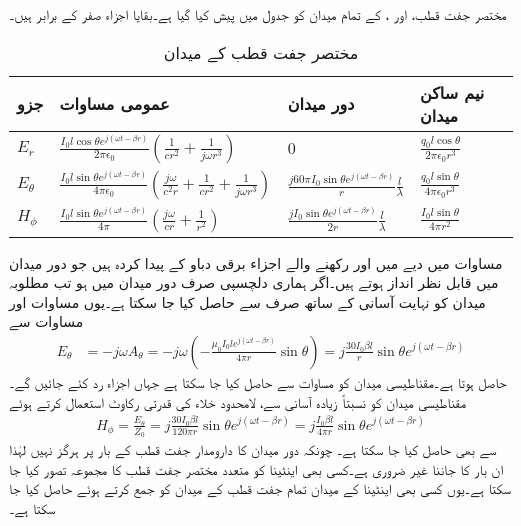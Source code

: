 مختصر جفت قطب،  اور ، کے تمام میدان کو جدول  میں پیش کیا گیا ہے۔بقایا اجزاء  صفر  کے برابر ہیں۔
\begin{table}
\caption{مختصر جفت قطب کے میدان}
\centering
\begin{tabular}{l l l l}
\hline
جزو & عمومی مساوات & دور میدان & نیم ساکن میدان\\
\hline 
\rule{0pt}{2em}
$E_r$ &$\frac{I_0 l \cos \theta e^{j(\omega t -\beta r)}}{2\pi \epsilon_0}\left(\frac{1}{c r^2}+\frac{1}{j \omega r^3} \right)$&$0$&$\frac{q_0 l \cos \theta}{2\pi \epsilon_0 r^3}$ \\[4ex]
$E_{\theta}$&$\frac{I_0 l \sin \theta e^{j(\omega t -\beta r)}}{4\pi \epsilon_0}\left(\frac{j \omega}{c^2 r}+\frac{1}{c r^2}+\frac{1}{j \omega r^3} \right)$&$ \frac{j 60 \pi I_0 \sin \theta e^{j(\omega t-\beta r)}}{r} \frac{l}{\lambda}$& $\frac{q_0 l \sin \theta }{4\pi \epsilon_0 r^3}$\\ [4ex]
$H_{\phi}$&$\frac{I_0 l \sin \theta e^{j(\omega t -\beta r)}}{4\pi} \left(\frac{j \omega}{c r}+\frac{1}{r^2} \right)$&$\frac{j I_0 \sin \theta e^{j(\omega t -\beta r)}}{2r}\frac{l}{\lambda}  $& $\frac{I_0 l \sin \theta }{4\pi r^2} $
\end{tabular}
\label{جدول_اینٹینا_مختصر_جفت_قطب}
\end{table}


مساوات  میں دیے   میں  اور  رکھنے والے اجزاء برقی دباو  کے پیدا کردہ ہیں جو دور میدان میں قابل نظر انداز ہوتے ہیں۔اگر ہماری دلچسپی صرف دور میدان میں ہو تب مطلوبہ میدان کو نہایت آسانی کے ساتھ صرف  سے حاصل کیا جا سکتا ہے۔یوں مساوات  اور مساوات  سے
\begin{align}\label{مساوات_اینٹینا_دور_میدان_برقی_رو_سے_حصول}
E_{\theta}&=-j \omega A_{\theta}=-j \omega \left(-\frac{ \mu_0 I_0 l e^{j(\omega t -\beta r)}}{4\pi r} \sin \theta \right)=j \frac{30 I_0 \beta l}{r} \sin \theta e^{j(\omega t-\beta r)}
\end{align}
حاصل ہوتا ہے۔مقناطیسی میدان  کو مساوات  سے حاصل کیا جا سکتا ہے  جہاں  اجزاء رد کئے جائیں گے۔مقناطیسی میدان  کو نسبتاً زیادہ آسانی سے، لامحدود خلاء کی قدرتی رکاوٹ  استعمال کرتے ہوئے
\begin{align}
H_{\phi}=\frac{E_{\theta}}{Z_0}=j \frac{30 I_0 \beta l}{120 \pi r} \sin \theta e^{j(\omega t-\beta r)}=j \frac{ I_0 \beta l}{4 \pi r} \sin \theta e^{j(\omega t-\beta r)}
\end{align}
سے بھی  حاصل کیا جا سکتا ہے۔ چونکہ دور میدان کا دارومدار جفت قطب کے بار  پر ہرگز نہیں لہٰذا ان بار کا جاننا غیر ضروری ہے۔کسی بھی اینٹینا کو متعدد مختصر جفت قطب کا مجموعہ تصور کیا جا سکتا ہے۔یوں کسی بھی اینٹینا کے میدان تمام جفت قطب کے میدان کو جمع کرتے ہوئے حاصل کیا جا سکتا ہے۔   

